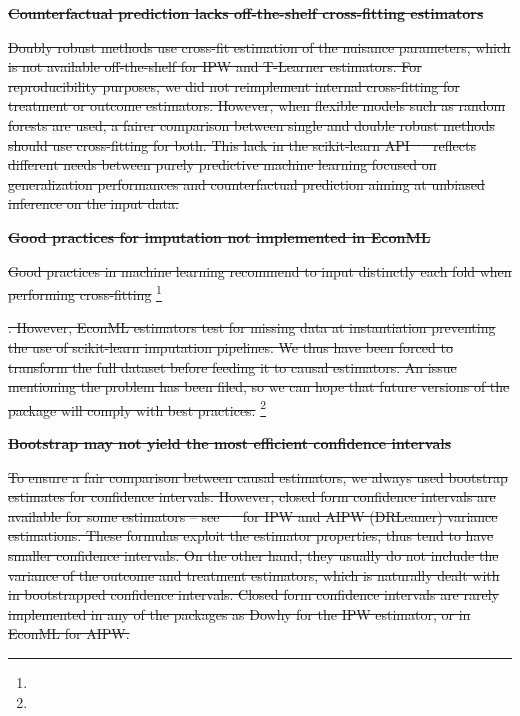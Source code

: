 \documentclass[10pt,letterpaper]{article}
\providecommand{\DIFdeltex}[1]{{\protect\color{red}\sout{#1}}}                      %
\providecommand{\DIFdelbegin}{} %
\providecommand{\DIFdel}[1]{\texorpdfstring{\DIFdeltex{#1}}{}} %
\newcommand{\DIFscaledelfig}{0.5}
\newlength{\DIFdelgraphicswidth} %
\newlength{\DIFdelgraphicsheight} %
\newcommand{\DIFdelincludegraphics}[2][]{%
\sbox{\DIFdelgraphicsbox}{\DIFOincludegraphics[#1]{#2}}%
\settoboxwidth{\DIFdelgraphicswidth}{\DIFdelgraphicsbox} %
\settoboxtotalheight{\DIFdelgraphicsheight}{\DIFdelgraphicsbox} %
\scalebox{\DIFscaledelfig}{%
\parbox[b]{\DIFdelgraphicswidth}{\usebox{\DIFdelgraphicsbox}\\[-\baselineskip] \rule{\DIFdelgraphicswidth}{0em}}\llap{\resizebox{\DIFdelgraphicswidth}{\DIFdelgraphicsheight}{%
\setlength{\unitlength}{\DIFdelgraphicswidth}%
\begin{picture}(1,1)%
\thicklines\linethickness{2pt} %
{\color[rgb]{1,0,0}\put(0,0){\framebox(1,1){}}}%
{\color[rgb]{1,0,0}\put(0,0){\line( 1,1){1}}}%
{\color[rgb]{1,0,0}\put(0,1){\line(1,-1){1}}}%
\end{picture}%
}\hspace*{3pt}}} %
} %
\DeclareRobustCommand{\DIFdelbegin}{\DIFOdelbegin \let\includegraphics\DIFdelincludegraphics} %
\begin{document}
\DIFdelbegin \textbf{\DIFdel{Counterfactual prediction lacks off-the-shelf cross-fitting estimators}}

\DIFdel{Doubly robust methods use cross-fit estimation of the nuisance parameters,
  which is not available off-the-shelf for IPW and T-Learner estimators. For
  reproducibility purposes, we did not reimplement internal cross-fitting for
  treatment or outcome estimators. However, when flexible models such as
  random forests are used, a fairer comparison between single and double
  robust methods should use cross-fitting for both. This lack in the
  scikit-learn API \mbox{%
    \cite{pedregosa2011scikit} }\hskip0pt%
  reflects different needs
  between purely predictive machine learning focused on generalization
  performances and counterfactual prediction aiming at unbiased inference on
  the input data.
}%

\textbf{\DIFdel{Good practices for imputation not implemented in EconML}}

\DIFdel{Good practices in machine learning recommend to input distinctly each fold
  when performing cross-fitting
}\footnote{%
}%
\addtocounter{footnote}{-1}%
\DIFdel{.
  However, EconML estimators test for missing data at instantiation
  preventing the use of scikit-learn imputation pipelines. We thus have been
  forced to transform the full dataset before feeding it to causal estimators.
  An issue mentioning the problem has been filed, so we can hope that future
  versions of the package will comply with best practices. }\footnote{%
}
\addtocounter{footnote}{-1}%

\textbf{\DIFdel{Bootstrap may not yield the most efficient confidence intervals}}

\DIFdel{To ensure a fair comparison between causal estimators, we always used
  bootstrap estimates for confidence intervals. However, closed form
  confidence intervals are available for some estimators -- see \mbox{%
    \cite{wager2020stats}
  }\hskip0pt%
  for IPW and AIPW (DRLeaner) variance estimations. These formulas exploit the
  estimator properties, thus tend to have smaller confidence intervals. On the
  other hand, they usually do not include the variance of the outcome and
  treatment estimators, which is naturally dealt with in bootstrapped confidence
  intervals. Closed form confidence intervals are rarely implemented in any of the
  packages as Dowhy for the IPW estimator, or in EconML for AIPW.
}%
\end{document}
